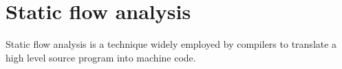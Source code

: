 \section{Static flow analysis}

Static flow analysis is a technique widely employed by compilers to translate a high level source program into machine code. 









































